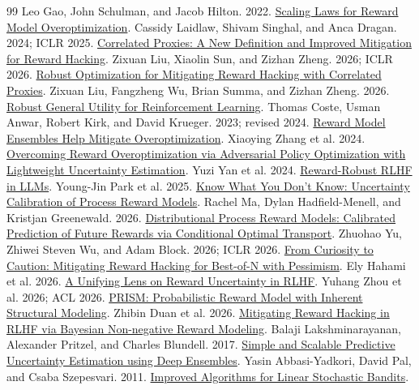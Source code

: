 \begin{thebibliography}{99}
 Leo Gao, John Schulman, and Jacob Hilton. 2022. \href{https://arxiv.org/abs/2210.10760}{Scaling Laws for Reward Model Overoptimization}.
 Cassidy Laidlaw, Shivam Singhal, and Anca Dragan. 2024; ICLR 2025. \href{https://arxiv.org/abs/2403.03185}{Correlated Proxies: A New Definition and Improved Mitigation for Reward Hacking}.
 Zixuan Liu, Xiaolin Sun, and Zizhan Zheng. 2026; ICLR 2026. \href{https://proceedings.iclr.cc/paper_files/paper/2026/hash/0904c7edde20d7134a77fc7f9cd86ea2-Abstract-Conference.html}{Robust Optimization for Mitigating Reward Hacking with Correlated Proxies}.
 Zixuan Liu, Fangzheng Wu, Brian Summa, and Zizhan Zheng. 2026. \href{https://arxiv.org/abs/2608.03562}{Robust General Utility for Reinforcement Learning}.
 Thomas Coste, Usman Anwar, Robert Kirk, and David Krueger. 2023; revised 2024. \href{https://arxiv.org/abs/2310.02743}{Reward Model Ensembles Help Mitigate Overoptimization}.
 Xiaoying Zhang et al. 2024. \href{https://arxiv.org/abs/2403.05171}{Overcoming Reward Overoptimization via Adversarial Policy Optimization with Lightweight Uncertainty Estimation}.
 Yuzi Yan et al. 2024. \href{https://arxiv.org/abs/2409.15360}{Reward-Robust RLHF in LLMs}.
 Young-Jin Park et al. 2025. \href{https://arxiv.org/abs/2506.09338}{Know What You Don't Know: Uncertainty Calibration of Process Reward Models}.
 Rachel Ma, Dylan Hadfield-Menell, and Kristjan Greenewald. 2026. \href{https://arxiv.org/abs/2605.06785}{Distributional Process Reward Models: Calibrated Prediction of Future Rewards via Conditional Optimal Transport}.
 Zhuohao Yu, Zhiwei Steven Wu, and Adam Block. 2026; ICLR 2026. \href{https://arxiv.org/abs/2604.04648}{From Curiosity to Caution: Mitigating Reward Hacking for Best-of-N with Pessimism}.
 Ely Hahami et al. 2026. \href{https://arxiv.org/abs/2606.09073}{A Unifying Lens on Reward Uncertainty in RLHF}.
 Yuhang Zhou et al. 2026; ACL 2026. \href{https://aclanthology.org/2026.acl-long.563/}{PRISM: Probabilistic Reward Model with Inherent Structural Modeling}.
 Zhibin Duan et al. 2026. \href{https://arxiv.org/abs/2602.10623}{Mitigating Reward Hacking in RLHF via Bayesian Non-negative Reward Modeling}.
 Balaji Lakshminarayanan, Alexander Pritzel, and Charles Blundell. 2017. \href{https://arxiv.org/abs/1612.01474}{Simple and Scalable Predictive Uncertainty Estimation using Deep Ensembles}.
 Yasin Abbasi-Yadkori, David Pal, and Csaba Szepesvari. 2011. \href{https://proceedings.neurips.cc/paper/2011/file/e1d5be1c7f2f456670de3d53c7b54f4a-Paper.pdf}{Improved Algorithms for Linear Stochastic Bandits}.

\end{thebibliography}
